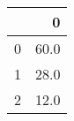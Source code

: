 \begin{tabular}{lr}
\toprule
{} &     0 \\
\midrule
0 &  60.0 \\
1 &  28.0 \\
2 &  12.0 \\
\bottomrule
\end{tabular}
